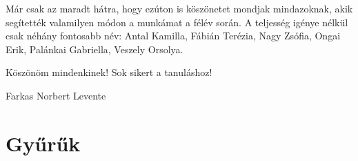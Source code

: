 \documentclass[12pt]{book}
\theoremstyle{plain} %
\theoremstyle{definition} %
\theoremstyle{remark}
\numberwithin{equation}{section}  %
\renewcommand{\chaptermark}[1]{\markboth{\thechapter.\ \MakeUppercase{#1}}{}} %
\begin{document}
	Már csak az maradt hátra, hogy ezúton is köszönetet mondjak mindazoknak, akik segítették valamilyen módon a munkámat a félév során. A teljesség igénye nélkül csak néhány fontosabb név: Antal Kamilla, Fábián Terézia, Nagy Zsófia, Ongai Erik, Palánkai Gabriella, Veszely Orsolya.
	
	Köszönöm mindenkinek! Sok sikert a tanuláshoz!
	
	Farkas Norbert Levente
	\newpage

	\chapter{Gyűrűk}
	\pagestyle{fancy}
	\renewcommand{\chaptermark}[1]{\markboth{\thechapter.\ \MakeUppercase{#1}}{}} %
	\fancyhf{}
	\fancyhead[LE]{\thepage}
	\fancyhead[RO]{\thepage}
	\fancyhead[LO]{\rightmark}
	\fancyhead[RE]{\leftmark}
	
\end{document}
